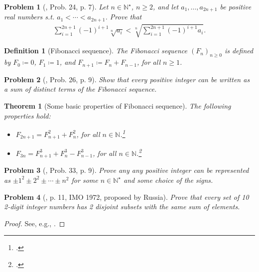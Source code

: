 \documentclass[oneside]{book}
\numberwithin{equation}{section}
\newtheorem{definition}{Definition}[section]
\newtheorem{theorem}{Theorem}[section]
\newtheorem{problem}{Problem}[section]
\begin{document}
\begin{problem}[\cite{Gelca_Andreescu2017}, Prob. 24, p. 7]
	Let $n\in\mathbb{N}^\star$, $n\ge 2$, and let $a_1,\ldots,a_{2n+1}$ be positive real numbers s.t. $a_1 < \cdots < a_{2n+1}$. Prove that
	\begin{align*}
		\sum_{i=1}^{2n+1} (-1)^{i+1}\sqrt[n]{a_i} < \sqrt[n]{\sum_{i=1}^{2n+1} (-1)^{i+1}a_i}.
	\end{align*}
\end{problem}

\begin{definition}[Fibonacci sequence]
	The \emph{Fibonacci sequence} $(F_n)_{n\ge 0}$ is defined by $F_0\coloneqq 0$, $F_1\coloneqq 1$, and $F_{n+1}\coloneqq F_n + F_{n-1}$, for all $n\ge 1$.
\end{definition}

\begin{problem}[\cite{Gelca_Andreescu2017}, Prob. 26, p. 9]
	Show that every positive integer can be written as a sum of distinct terms of the Fibonacci sequence.
\end{problem}

\begin{theorem}[Some basic properties of Fibonacci sequence]
	The following properties hold:
	\begin{itemize}
		\item $F_{2n+1} = F_{n+1}^2 + F_n^2$, for all $n\in\mathbb{N}$.\footnote{\cite[Prob. 27, p. 9]{Gelca_Andreescu2017}.}
		\item $F_{3n} = F_{n+1}^3 + F_n^3 - F_{n-1}^3$, for all $n\in\mathbb{N}$.\footnote{\cite[Prob. 28, p. 9]{Gelca_Andreescu2017}.}
	\end{itemize}
\end{theorem}

\begin{problem}[\cite{Gelca_Andreescu2017}, Prob. 33, p. 9]
	Prove any any positive integer can be represented as $\pm1^2\pm2^2\pm\cdots\pm n^2$ for some $n\in\mathbb{N}^\star$ and some choice of the signs.
\end{problem}

\begin{problem}[\cite{Gelca_Andreescu2017}, p. 11, IMO 1972, proposed by Russia]
	Prove that every set of 10 2-digit integer numbers has 2 disjoint subsets with the same sum of elements.
\end{problem}

\begin{proof}[Proof]
	See, e.g., \cite[p. 11]{Gelca_Andreescu2017}.
\end{proof}
\end{document}
